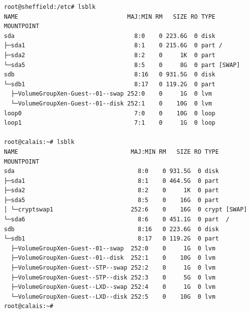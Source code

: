 \documentclass[10pt,a4paper]{article}
\begin{document}
\begin{verbatim}
root@sheffield:/etc# lsblk
NAME                               MAJ:MIN RM   SIZE RO TYPE MOUNTPOINT
sda                                  8:0    0 223.6G  0 disk 
├─sda1                               8:1    0 215.6G  0 part /
├─sda2                               8:2    0     1K  0 part 
└─sda5                               8:5    0     8G  0 part [SWAP]
sdb                                  8:16   0 931.5G  0 disk 
└─sdb1                               8:17   0 119.2G  0 part 
  ├─VolumeGroupXen-Guest--01--swap 252:0    0     1G  0 lvm  
  └─VolumeGroupXen-Guest--01--disk 252:1    0    10G  0 lvm  
loop0                                7:0    0    10G  0 loop 
loop1                                7:1    0     1G  0 loop 

root@calais:~# lsblk
NAME                                MAJ:MIN RM   SIZE RO TYPE  MOUNTPOINT
sda                                   8:0    0 931.5G  0 disk  
├─sda1                                8:1    0 464.5G  0 part  
├─sda2                                8:2    0     1K  0 part  
├─sda5                                8:5    0    16G  0 part  
│ └─cryptswap1                      252:6    0    16G  0 crypt [SWAP]
└─sda6                                8:6    0 451.1G  0 part  /
sdb                                   8:16   0 223.6G  0 disk  
└─sdb1                                8:17   0 119.2G  0 part  
  ├─VolumeGroupXen-Guest--01--swap  252:0    0     1G  0 lvm   
  ├─VolumeGroupXen-Guest--01--disk  252:1    0    10G  0 lvm   
  ├─VolumeGroupXen-Guest--STP--swap 252:2    0     1G  0 lvm   
  ├─VolumeGroupXen-Guest--STP--disk 252:3    0     5G  0 lvm   
  ├─VolumeGroupXen-Guest--LXD--swap 252:4    0     1G  0 lvm   
  └─VolumeGroupXen-Guest--LXD--disk 252:5    0    10G  0 lvm   
root@calais:~# 
\end{verbatim}
\end{document}
